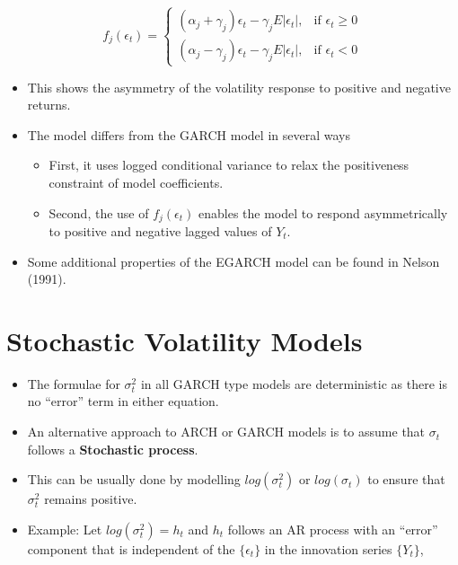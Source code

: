 \documentclass[]{book}
\providecommand{\tightlist}{%
  \setlength{\itemsep}{0pt}\setlength{\parskip}{0pt}}
\begin{document}
\[
    f_j(\epsilon_t)= 
\begin{cases}
    (\alpha_j+\gamma_j)\epsilon_t-\gamma_jE|\epsilon_t|,& \text{if } \epsilon_t\geq 0\\
    (\alpha_j-\gamma_j)\epsilon_t-\gamma_jE|\epsilon_t|,& \text{if } \epsilon_t< 0
\end{cases}
\]

\begin{itemize}
\tightlist
\item
  This shows the asymmetry of the volatility response to positive and negative returns.
\item
  The model differs from the GARCH model in several ways

  \begin{itemize}
  \tightlist
  \item
    First, it uses logged conditional variance to relax the positiveness constraint of model coefficients.
  \item
    Second, the use of \(f_j(\epsilon_t)\) enables the model to respond asymmetrically to positive and negative lagged values of \(Y_t.\)
  \end{itemize}
\item
  Some additional properties of the EGARCH model can be found in Nelson (1991).
\end{itemize}

\hypertarget{stochastic-volatility-models}{%
\section{Stochastic Volatility Models}\label{stochastic-volatility-models}}

\begin{itemize}
\tightlist
\item
  The formulae for \(\sigma_t^2\) in all GARCH type models are deterministic as there is no ``error'' term in either equation.
\item
  An alternative approach to ARCH or GARCH models is to assume that \(\sigma_t\) follows a \textbf{Stochastic process}.
\item
  This can be usually done by modelling \(log(\sigma_t^2)\) or \(log(\sigma_t)\) to ensure that \(\sigma_t^2\) remains positive.
\item
  Example: Let \(log(\sigma_t^2)=h_t\) and \(h_t\) follows an AR process with an ``error'' component that is independent of the \(\{\epsilon_t\}\) in the innovation series \(\{Y_t\}\),
\end{itemize}
\end{document}
